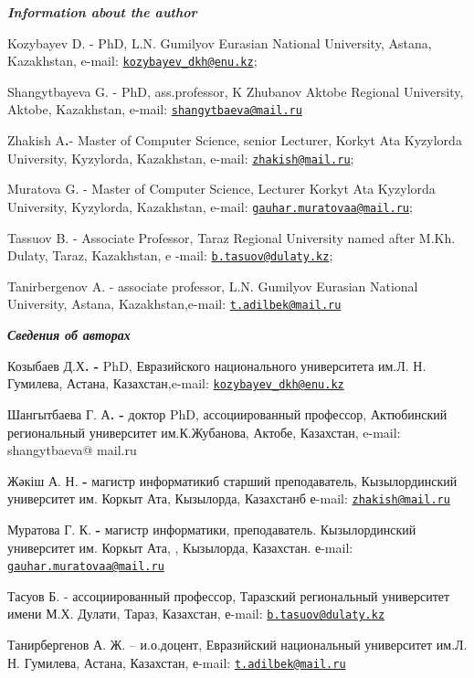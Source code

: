 \emph{{\bfseries Information about the author}}

Kozybayev D. - PhD, L.N. Gumilyov Eurasian National University, Astana,
Kazakhstan, e-mail:
\href{mailto:kozybayev_dkh@enu.kz}{\nolinkurl{kozybayev\_dkh@enu.kz}};

Shangytbayeva G. - PhD, ass.professor, K Zhubanov Aktobe Regional
University, Aktobe, Kazakhstan, e-mail:
\href{mailto:shangytbaeva@mail.ru}{\nolinkurl{shangytbaeva@mail.ru}}

Zhakish A{\bfseries .}- Master of Computer Science, senior Lecturer, Korkyt
Ata Kyzylorda University, Kyzylorda, Kazakhstan, e-mail:
\href{mailto:zhakish@mail.ru}{\nolinkurl{zhakish@mail.ru}};

Muratova G. - Master of Computer Science, Lecturer Korkyt Ata Kyzylorda
University, Kyzylorda, Kazakhstan, e-mail:
\href{mailto:gauhar.muratovaa@mail.ru}{\nolinkurl{gauhar.muratovaa@mail.ru}};

Tassuov B. - Associate Professor, Taraz Regional University named after
M.Kh. Dulaty, Taraz, Kazakhstan, e -mail:
\href{mailto:b.tasuov@dulaty.kz}{\nolinkurl{b.tasuov@dulaty.kz}};

Tanirbergenov A. - associate professor, L.N. Gumilyov Eurasian National
University, Astana, Kazakhstan,e-mail:
\href{mailto:t.adilbek@mail.ru}{\nolinkurl{t.adilbek@mail.ru}}

\emph{{\bfseries Сведения об авторах}}

Козыбаев Д.Х{\bfseries . -} PhD, Евразийского национального университета
им.Л. Н. Гумилева, Астана, Казахстан,e-mail:
\href{mailto:kozybayev_dkh@enu.kz}{\nolinkurl{kozybayev\_dkh@enu.kz}}

Шангытбаева Г. А{\bfseries . -} доктор PhD, ассоциированный профессор,
Актюбинский региональный университет им.К.Жубанова, Актобе, Казахстан,
e-mail: shangytbaeva@ mail.ru

Жәкіш А. Н. {\bfseries -} магистр информатикиб старший преподаватель,
Кызылординский университет им. Коркыт Ата, Кызылорда, Казахстанб е-mail:
\href{mailto:zhakish@mail.ru}{\nolinkurl{zhakish@mail.ru}}

Муратова Г. К. {\bfseries -} магистр информатики, преподаватель.
Кызылординский университет им. Коркыт Ата, , Кызылорда, Казахстан.
е-mail:
\href{mailto:gauhar.muratovaa@mail.ru}{\nolinkurl{gauhar.muratovaa@mail.ru}}

Тасуов Б. - ассоциированный профессор, Таразский региональный
университет имени М.Х. Дулати, Тараз, Казахстан, е-mail:
\href{mailto:b.tasuov@dulaty.kz}{\nolinkurl{b.tasuov@dulaty.kz}}

Танирбергенов А. Ж. -- и.о.доцент, Евразийский национальный университет
им.Л. Н. Гумилева, Астана, Казахстан, е-mail:
\href{mailto:t.adilbek@mail.ru}{\nolinkurl{t.adilbek@mail.ru}}